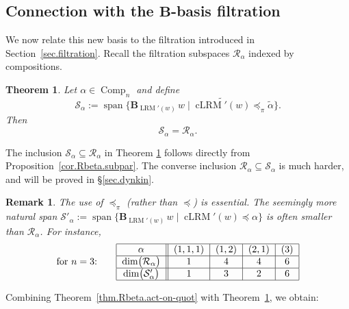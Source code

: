 \documentclass[submission]{FPSAC2026}
\newtheorem{theorem}{Theorem}
\newtheorem{remark}{Remark}
\newcommand{\Comp}{\operatorname{Comp}}
\begin{document}
\subsection{Connection with the $\mathbf{B}$-basis filtration}
\label{sec.rs}
We now relate this new basis to the filtration introduced in Section~\ref{sec.filtration}.  Recall the filtration subspaces $\mathcal{R}_\alpha$ indexed by compositions.

\begin{theorem}
\label{thm.LRM.filtbasis}
Let $\alpha\in\Comp_n$ and define
\[
\mathcal{S}_\alpha
 := \operatorname{span}\bigl\{
\mathbf{B}_{\operatorname{LRM}'(w)}\, w
 \;\big|\;
\widetilde{\operatorname{cLRM}'(w)}\preceq_\pi \widetilde{\alpha}
\bigr\}.
\]
Then
\[
\mathcal{S}_\alpha = \mathcal{R}_\alpha.
\]
\end{theorem}

The inclusion
$\mathcal{S}_\alpha \subseteq \mathcal{R}_\alpha$
in Theorem \ref{thm.LRM.filtbasis}
follows directly from Proposition~\ref{cor.Rbeta.subpar}.
The converse inclusion
$\mathcal{R}_\alpha \subseteq \mathcal{S}_\alpha$
is much harder, and will be proved in \S \ref{sec.dynkin}.

 
\begin{remark}
The use of $\preceq_\pi$ (rather than $\preceq$)
is essential.  
The seemingly more natural span
\(
\mathcal{S}'_\alpha
 :=
 \operatorname{span}\bigl\{
\mathbf{B}_{\operatorname{LRM}'(w)}\, w
\;\big|\;
\operatorname{cLRM}'(w)\preceq \alpha
\bigr\}
\)
is often smaller than $\mathcal{R}_\alpha$.
For instance,%
\[
\text{for $n = 3$:} \qquad
\begin{tabular}{|c||c|c|c|c|}
\hline
$\alpha$ & $(1,1,1)$ & $(1,2)$ & $(2,1)$ & $(3)$ \\
\hline
$\dim\bigl(\mathcal{R}_\alpha\bigr)$ & $1$ & $4$ & $4$ & $6$\\
\hline
$\dim\bigl(\mathcal{S}'_\alpha\bigr)$ & $1$ & $3$ & $2$ & $6$\\
\hline
\end{tabular}
\]
\end{remark}

Combining Theorem~\ref{thm.Rbeta.act-on-quot} with
Theorem~\ref{thm.LRM.filtbasis}, we obtain:
\end{document}
